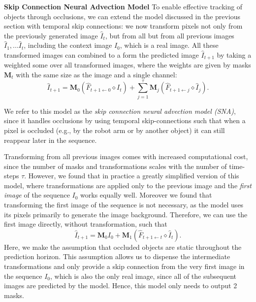 \textbf{Skip Connection Neural Advection Model}
To enable effective tracking of objects through occlusions, we can extend the model discussed in the previous section with temporal skip connections: we now transform pixels not only from the previously generated image $\hat{I}_t$, but from all but from all previous images $\hat{I}_1,...\hat{I}_{t}$, including the context image $I_0$, which is a real image. All these transformed images can combined to a form the predicted image $\hat{I}_{t+1}$ by taking a weighted some over all transformed images, where the weights are given by masks $\mathbf{M}_t$ with the same size as the image and a single channel:
\begin{equation}
\hat{I}_{t+1} =  \mathbf{M}_{0} (\hat{F}_{t+1 \leftarrow 0} \diamond I_t) +  \sum_{j=1}^{\tau} \mathbf{M}_{j} (\hat{F}_{t+1 \leftarrow j} \diamond  \hat{I}_j).
\end{equation}

We refer to this model as the \emph{skip connection neural advection model (SNA)}, since it handles occlusions by using temporal skip-connections such that when a pixel is occluded (e.g., by the robot arm or by another object) it can still reappear later in the sequence.

Transforming from all previous images comes with increased computational cost, since the number of masks and transformations scales with the number of time-steps $\tau$. However, we found that in practice a greatly simplified version of this model, where transformations are applied only to the previous image and the \emph{first image} of the sequence $I_0$ works equally well. Moreover we found that transforming the first image of the sequence is not necessary, as the model uses its pixels primarily to generate the image background. Therefore, we can use the first image directly, without transformation, such that
\begin{equation}
\hat{I}_{t+1} = \mathbf{M}_{0} I_0 +  \mathbf{M}_{1} (\hat{F}_{t+1 \leftarrow t} \diamond \hat{I}_t).
\label{eqn:simplemodel}
\end{equation}
Here, we make the assumption that occluded objects are static throughout the prediction horizon. This assumption allows us to dispense the intermediate transformations and only provide a skip connection from the very first image in the sequence $I_0$, which is also the only real image, since all of the subsequent images are predicted by the model. Hence, this model only needs to output 2 masks. 

